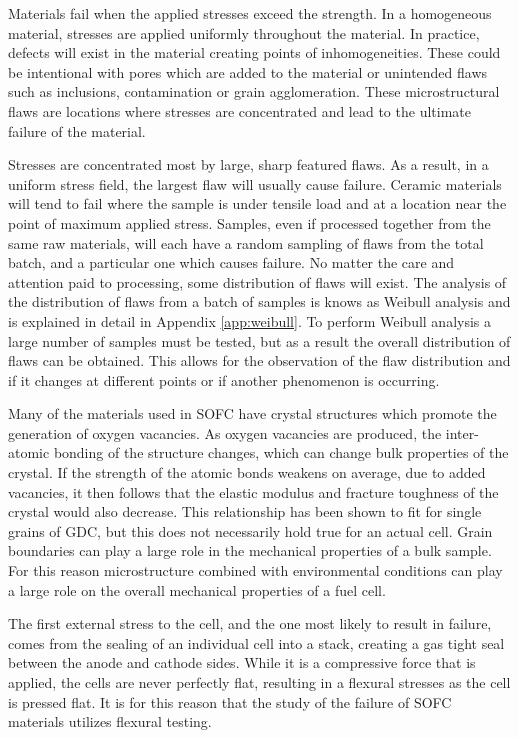 Materials fail when the applied stresses exceed the strength.
In a homogeneous material, stresses are applied uniformly throughout the material.
In practice, defects will exist in the material creating points of inhomogeneities.
These could be intentional with pores which are added to the material or unintended flaws such as inclusions, contamination or grain agglomeration.
These microstructural flaws are locations where stresses are concentrated and lead to the ultimate failure of the material.

Stresses are concentrated most by large, sharp featured flaws.
As a result, in a uniform stress field, the largest flaw will usually cause failure.
Ceramic materials will tend to fail where the sample is under tensile load and at a location near the point of maximum applied stress.
Samples, even if processed together from the same raw materials, will each have a random sampling of flaws from the total batch, and a particular one which causes failure.
No matter the care and attention paid to processing, some distribution of flaws will exist.
The analysis of the distribution of flaws from a batch of samples is knows as Weibull analysis and is explained in detail in Appendix \ref{app:weibull}.
To perform Weibull analysis a large number of samples must be tested, but as a result the overall distribution of flaws can be obtained.
This allows for the observation of the flaw distribution and if it changes at different points or if another phenomenon is occurring.

Many of the materials used in SOFC have crystal structures which promote the generation of oxygen vacancies.
As oxygen vacancies are produced, the inter-atomic bonding of the structure changes, which can change bulk properties of the crystal.\cite{Bishop2014,Duncan2006}
If the strength of the atomic bonds weakens on average, due to added vacancies, it then follows that the elastic modulus and fracture toughness of the crystal would also decrease.
This relationship has been shown to fit for single grains of GDC, but this does not necessarily hold true for an actual cell.\cite{Wang2007}
Grain boundaries can play a large role in the mechanical properties of a bulk sample.
For this reason microstructure combined with environmental conditions can play a large role on the overall mechanical properties of a fuel cell.

The first external stress to the cell, and the one most likely to result in failure, comes from the  sealing of an individual cell into a stack, creating a gas tight seal between the anode and cathode sides.
While it is a compressive force that is applied, the cells are never perfectly flat, resulting in a flexural stresses as the cell is pressed flat.
It is for this reason that the study of the failure of SOFC materials utilizes flexural testing.

